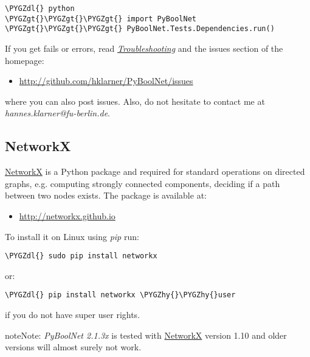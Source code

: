 \documentclass[letterpaper,10pt,english]{sphinxmanual}
\def\PYGZgt{\char`\>}
\def\PYGZdl{\char`\$}
\def\PYGZhy{\char`\-}
\begin{document}
\begin{Verbatim}[commandchars=\\\{\}]
\PYGZdl{} python
\PYGZgt{}\PYGZgt{}\PYGZgt{} import PyBoolNet
\PYGZgt{}\PYGZgt{}\PYGZgt{} PyBoolNet.Tests.Dependencies.run()
\end{Verbatim}

If you get fails or errors, read {\hyperref[Installation:installation-troubleshooting]{\emph{Troubleshooting}}} and the issues section of the homepage:
\begin{itemize}
\item {} 
\href{http://github.com/hklarner/PyBoolNet/issues}{http://github.com/hklarner/PyBoolNet/issues}

\end{itemize}

where you can also post issues. Also, do not hesitate to contact me at \emph{hannes.klarner@fu-berlin.de}.


\subsection{NetworkX}
\label{Installation:installation-networkx}\label{Installation:networkx}
\href{https://networkx.github.io/}{NetworkX} is a Python package and required for standard operations on directed graphs, e.g. computing strongly connected components,
deciding if a path between two nodes exists.
The package is available at:
\begin{itemize}
\item {} 
\href{http://networkx.github.io}{http://networkx.github.io}

\end{itemize}

To install it on Linux using \emph{pip} run:

\begin{Verbatim}[commandchars=\\\{\}]
\PYGZdl{} sudo pip install networkx
\end{Verbatim}

or:

\begin{Verbatim}[commandchars=\\\{\}]
\PYGZdl{} pip install networkx \PYGZhy{}\PYGZhy{}user
\end{Verbatim}

if you do not have super user rights.

\begin{notice}{note}{Note:}
\emph{PyBoolNet 2.1.3x} is tested with \href{https://networkx.github.io/}{NetworkX} version 1.10 and older versions will almost surely not work.
\end{notice}
\end{document}
